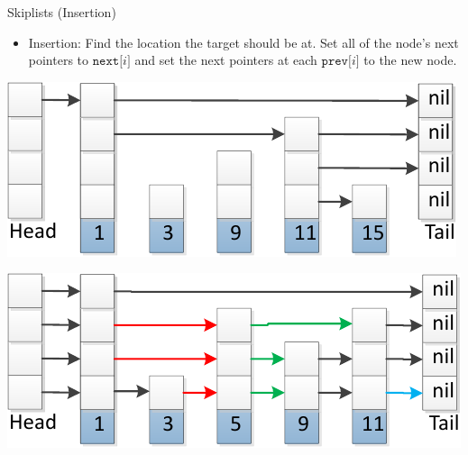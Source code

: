 \documentclass{beamer}
\begin{document}
\begin{frame}{Skiplists (Insertion)}
  \begin{itemize}
    \item Insertion: Find the location the target should be at.
      Set all of the node's next pointers to $\mathtt{next[}i\mathtt{]}$ and set
      the next pointers at each $\mathtt{prev[}i\mathtt{]}$ to the new node.
  \end{itemize}
  \begin{center}
    \includegraphics[scale=0.75]{img/skiplistSearch15-crop.pdf}
  \end{center}
  \begin{center}
    \includegraphics[scale=0.75]{img/skiplistInsert5-crop.pdf}
  \end{center}
\end{frame}
\end{document}
